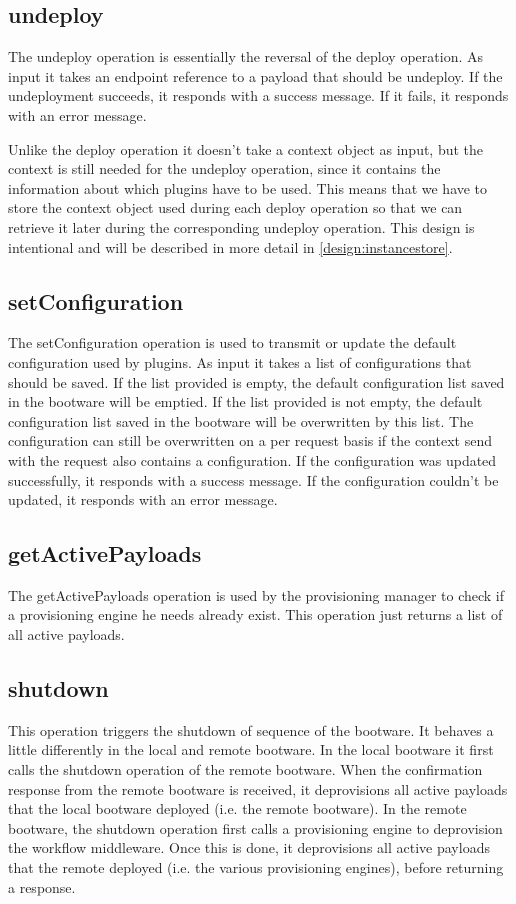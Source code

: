 \subsection{undeploy}

The undeploy operation is essentially the reversal of the deploy operation.
As input it takes an endpoint reference to a payload that should be undeploy.
If the undeployment succeeds, it responds with a success message.
If it fails, it responds with an error message.

Unlike the deploy operation it doesn't take a context object as input, but the context is still needed for the undeploy operation, since it contains the information about which plugins have to be used.
This means that we have to store the context object used during each deploy operation so that we can retrieve it later during the corresponding undeploy operation.
This design is intentional and will be described in more detail in \autoref{design:instancestore}.

\subsection{setConfiguration}

The setConfiguration operation is used to transmit or update the default configuration used by plugins.
As input it takes a list of configurations that should be saved.
If the list provided is empty, the default configuration list saved in the bootware will be emptied.
If the list provided is not empty, the default configuration list saved in the bootware will be overwritten by this list.
The configuration can still be overwritten on a per request basis if the context send with the request also contains a configuration.
If the configuration was updated successfully, it responds with a success message.
If the configuration couldn't be updated, it responds with an error message.

\subsection{getActivePayloads}

The getActivePayloads operation is used by the provisioning manager to check if a provisioning engine he needs already exist.
This operation just returns a list of all active payloads.

\subsection{shutdown}

This operation triggers the shutdown of sequence of the bootware.
It behaves a little differently in the local and remote bootware.
In the local bootware it first calls the shutdown operation of the remote bootware.
When the confirmation response from the remote bootware is received, it deprovisions all active payloads that the local bootware deployed (i.e. the remote bootware).
In the remote bootware, the shutdown operation first calls a provisioning engine to deprovision the workflow middleware.
Once this is done, it deprovisions all active payloads that the remote deployed (i.e. the various provisioning engines), before returning a response.

